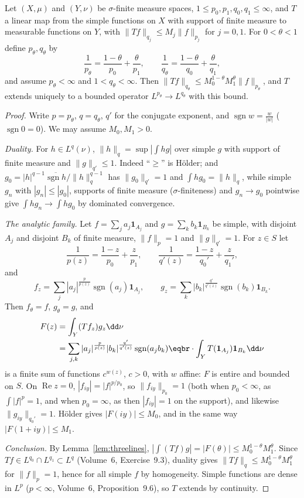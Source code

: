\begin{theorem}\label{thm:rieszthorin}
Let $(X,\mu)$ and $(Y,\nu)$ be $\sigma$-finite measure spaces, $1\le p_0,p_1,q_0,q_1\le\infty$, and $T$ a linear map from the simple functions on $X$ with support of finite measure to measurable functions on $Y$, with
$\|Tf\|_{q_j}\le M_j\|f\|_{p_j}$ for $j=0,1$. For $0<\theta<1$ define $p_\theta,q_\theta$ by
\[\frac1{p_\theta}=\frac{1-\theta}{p_0}+\frac\theta{p_1},\qquad\frac1{q_\theta}=\frac{1-\theta}{q_0}+\frac\theta{q_1},\]
and assume $p_\theta<\infty$ and $1<q_\theta<\infty$. Then $\|Tf\|_{q_\theta}\le M_0^{1-\theta}M_1^\theta\|f\|_{p_\theta}$, and $T$ extends uniquely to a bounded operator $L^{p_\theta}\to L^{q_\theta}$ with this bound.
\end{theorem}
\begin{proof}
Write $p=p_\theta$, $q=q_\theta$, $q'$ for the conjugate exponent, and $\operatorname{sgn}w=\frac w{|w|}$ ($\operatorname{sgn}0=0$). We may assume $M_0,M_1>0$.

\emph{Duality.} For $h\in L^q(\nu)$, $\|h\|_q=\sup|\int hg|$ over simple $g$ with support of finite measure and $\|g\|_{q'}\le1$. Indeed ``$\ge$'' is H\"older; and $g_0=|h|^{q-1}\overline{\operatorname{sgn}h}/\|h\|_q^{q-1}$ has
$\|g_0\|_{q'}=1$ and $\int hg_0=\|h\|_q$, while simple $g_n$ with $|g_n|\le|g_0|$, supports of finite measure ($\sigma$-finiteness) and $g_n\to g_0$ pointwise give $\int hg_n\to\int hg_0$ by dominated convergence.

\emph{The analytic family.} Let $f=\sum_ja_j\mathbf 1_{A_j}$ and $g=\sum_kb_k\mathbf 1_{B_k}$ be simple, with disjoint $A_j$ and disjoint $B_k$ of finite measure, $\|f\|_p=1$ and $\|g\|_{q'}=1$. For $z\in S$ let
\[\frac1{p(z)}=\frac{1-z}{p_0}+\frac z{p_1},\qquad\frac1{q'(z)}=\frac{1-z}{q_0'}+\frac z{q_1'},\]
and
\[f_z=\sum_j|a_j|^{\frac p{p(z)}}\operatorname{sgn}(a_j)\mathbf 1_{A_j},\qquad g_z=\sum_k|b_k|^{\frac{q'}{q'(z)}}\operatorname{sgn}(b_k)\mathbf 1_{B_k}.\]
Then $f_\theta=f$, $g_\theta=g$, and
\[\begin{aligned}F(z)&=\int_Y(Tf_z)g_z\dd\nu\\&=\sum_{j,k}|a_j|^{\frac p{p(z)}}|b_k|^{\frac{q'}{q'(z)}}\operatorname{sgn}(a_jb_k)\eqbr\cdot\int_YT(\mathbf 1_{A_j})\mathbf 1_{B_k}\dd\nu\end{aligned}\]
is a finite sum of functions $c^{w(z)}$, $c>0$, with $w$ affine: $F$ is entire and bounded on $S$. On $\operatorname{Re}z=0$, $|f_{iy}|=|f|^{p/p_0}$, so $\|f_{iy}\|_{p_0}=1$ (both when $p_0<\infty$, as
$\int|f|^p=1$, and when $p_0=\infty$, as then $|f_{iy}|=1$ on the support), and likewise $\|g_{iy}\|_{q_0'}=1$. H\"older gives $|F(iy)|\le M_0$, and in the same way $|F(1+iy)|\le M_1$.

\emph{Conclusion.} By Lemma~\ref{lem:threelines}, $|\int(Tf)g|=|F(\theta)|\le M_0^{1-\theta}M_1^\theta$. Since $Tf\in L^{q_0}\cap L^{q_1}\subset L^q$ (Volume~6, Exercise~9.3), duality gives $\|Tf\|_q\le M_0^{1-\theta}M_1^\theta$
for $\|f\|_p=1$, hence for all simple $f$ by homogeneity. Simple functions are dense in $L^p$ ($p<\infty$, Volume~6, Proposition~9.6), so $T$ extends by continuity.
\end{proof}

